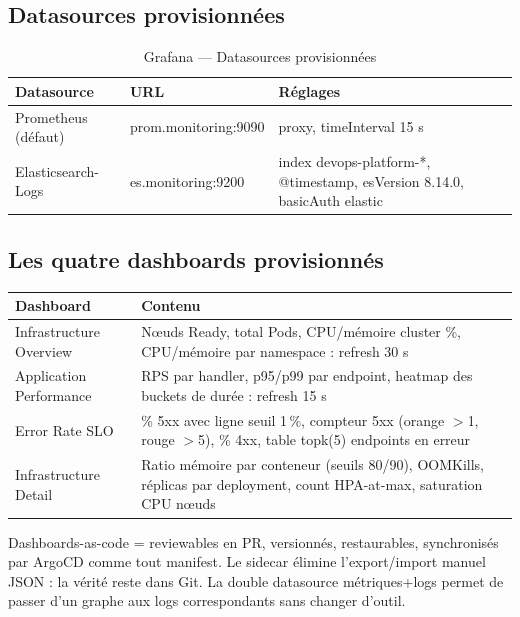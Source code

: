 \documentclass[12pt,a4paper,twoside,openright]{report}
\begin{document}
\subsection{Datasources provisionnées}
\begin{table}[H]
\centering\small
\caption{Grafana --- Datasources provisionnées}\label{tab:ch-grafana-datasources-provisionnees}
\begin{tabular}{@{}p{3.4cm}p{4.4cm}p{7.4cm}@{}}
\toprule
\textbf{Datasource} & \textbf{URL} & \textbf{Réglages} \\
\midrule
Prometheus (défaut) & prom.monitoring:9090 & proxy, timeInterval 15 s \\
Elasticsearch-Logs & es.monitoring:9200 & index devops-platform-*, @timestamp, esVersion 8.14.0, basicAuth elastic \\
\bottomrule
\end{tabular}
\end{table}

\subsection{Les quatre dashboards provisionnés}
\begin{center}\label{tab:ch-grafana-les-quatre-dashboards-provisionnes}\end{center}
\begin{longtable}{@{}p{4.2cm}p{9.8cm}@{}}
\toprule
\textbf{Dashboard} & \textbf{Contenu} \\
\midrule
\endhead
Infrastructure Overview & Nœuds Ready, total Pods, CPU/mémoire cluster \%, CPU/mémoire par namespace : refresh 30 s \\
Application Performance & RPS par handler, p95/p99 par endpoint, heatmap des buckets de durée : refresh 15 s \\
Error Rate SLO & \% 5xx avec ligne seuil 1\,\%, compteur 5xx (orange $>$1, rouge $>$5), \% 4xx, table topk(5) endpoints en erreur \\
Infrastructure Detail & Ratio mémoire par conteneur (seuils 80/90), OOMKills, réplicas par deployment, count HPA-at-max, saturation CPU nœuds \\
\bottomrule
\end{longtable}

\begin{whybox}
Dashboards-as-code = reviewables en PR, versionnés, restaurables, synchronisés par ArgoCD comme tout manifest. Le sidecar élimine l'export/import manuel JSON : la vérité reste dans Git. La double datasource métriques+logs permet de passer d'un graphe aux logs correspondants sans changer d'outil.
\end{whybox}
\end{document}
